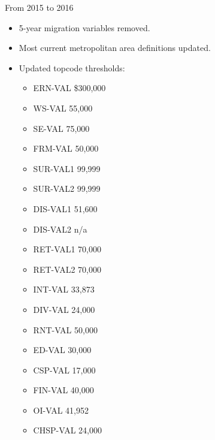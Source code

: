 \documentclass{article}
\begin{document}
From 2015 to 2016
\begin{itemize}
	\item 5-year migration variables removed.
	\item Most current metropolitan area definitions updated.
		\item Updated topcode thresholds:
	\begin{itemize}
		\item ERN-VAL \$300,000
		\item WS-VAL	55,000 
		\item SE-VAL 75,000
		\item FRM-VAL 50,000  
		\item SUR-VAL1 99,999
		\item SUR-VAL2 99,999 
		\item DIS-VAL1 51,600
		\item DIS-VAL2  n/a
		\item RET-VAL1 70,000
		\item RET-VAL2 70,000
		\item INT-VAL 33,873
		\item DIV-VAL 24,000
		\item RNT-VAL 50,000
		\item ED-VAL 30,000
		\item CSP-VAL 17,000
		\item FIN-VAL 40,000
		\item OI-VAL 41,952
		\item CHSP-VAL 24,000
	\end{itemize}
\end{itemize}
\end{document}
